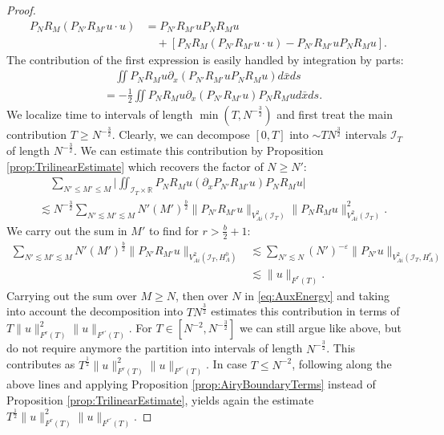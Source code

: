 \documentclass{amsart}
\theoremstyle{definition}
\newcommand{\R}{\mathbb{R}}
\begin{document}
\begin{proof}
\begin{equation*}
\begin{split}
P_N R_M ( P_{N'} R_{M'} u \cdot u) &= P_{N'} R_{M'} u P_N R_M u \\
&\quad + [ P_N R_M ( P_{N'} R_{M'} u \cdot u) - P_{N'} R_{M'} u P_N R_M u ].
\end{split}
\end{equation*}
The contribution of the first expression is easily handled by integration by parts:
\begin{equation*}
\begin{split}
&\quad \iint P_N R_M u \partial_x (P_{N'} R_{M'} u P_N R_M u) d\bar{x} ds \\
&= - \frac{1}{2} \iint P_N R_M u \partial_x (P_{N'} R_{M'} u) P_N R_M u d\bar{x} ds.
\end{split}
\end{equation*}
We localize time to intervals of length $\min(T, N^{-\frac{3}{2}})$ and first treat the main contribution $T \geq N^{-\frac{3}{2}}$. Clearly, we can decompose $[0,T]$ into $\sim T N^{\frac{3}{2}}$ intervals $\mathcal{I}_T$ of length $N^{-\frac{3}{2}}$. We can estimate this contribution by Proposition \ref{prop:TrilinearEstimate} which recovers the factor of $N \geq N'$:
\begin{equation}
\label{eq:AuxEnergy}
\begin{split}
&\quad \sum_{N' \leq M' \leq M} \big| \iint_{\mathcal{I}_T \times \R} P_N R_M u (\partial_x P_{N'} R_{M'} u ) P_N R_M u \big| \\
&\lesssim N^{-\frac{3}{2}} \sum_{N' \lesssim M' \lesssim M} N' (M')^{\frac{b}{2}} \| P_{N'} R_{M'} u \|_{V^2_{Ai}(\mathcal{I}_T)} \| P_N R_M u \|^2_{V^2_{Ai}(\mathcal{I}_T)}.
\end{split}
\end{equation}
We carry out the sum in $M'$ to find for $r> \frac{b}{2}+1$:
\begin{equation*}
\begin{split}
\sum_{N' \lesssim M' \lesssim M} N' (M')^{\frac{b}{2}} \| P_{N'} R_{M'} u \|_{V^2_{Ai}(\mathcal{I}_T,H^0_{\Lambda})}  &\lesssim \sum_{N' \lesssim N} (N')^{-\varepsilon} \| P_{N'} u \|_{V^2_{Ai}(\mathcal{I}_T,H^r_{\Lambda})} \\
&\lesssim \| u \|_{F^r(T)}.
\end{split}
\end{equation*}
Carrying out the sum over $M \geq N$, then over $N$ in \eqref{eq:AuxEnergy} and taking into account the decomposition into $T N^{\frac{3}{2}}$ estimates this contribution in terms of $T \| u \|^2_{F^r(T)} \| u \|_{F^{r'}(T)}$. For $T \in [N^{-2},N^{-\frac{3}{2}}]$ we can still argue like above, but do not require anymore the partition into intervals of length $N^{-\frac{3}{2}}$. This contributes as $T^{\frac{1}{2}} \| u \|_{F^r(T)}^2 \| u \|_{F^{r'}(T)}$. In case $T \leq N^{-2}$, following along the above lines and applying Proposition \ref{prop:AiryBoundaryTerms} instead of Proposition \ref{prop:TrilinearEstimate}, yields again the estimate $T^{\frac{1}{2}} \| u \|_{F^r(T)}^2 \| u \|_{F^{r'}(T)}$.


\end{proof}
\end{document}
